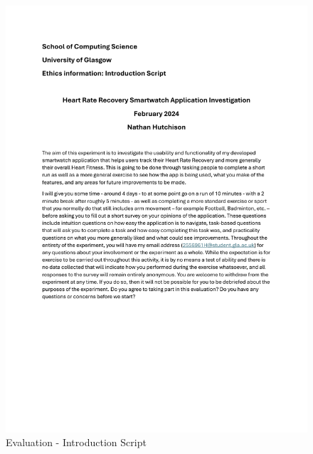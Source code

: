 \documentclass{l4proj}
\begin{document}
\begin{figure}[h!]
    \centering
    \includegraphics[width=1\linewidth]{dissertation//dissImages/IntroductionScript.pdf}
    \caption{Evaluation - Introduction Script}
\end{figure}
\end{document}
